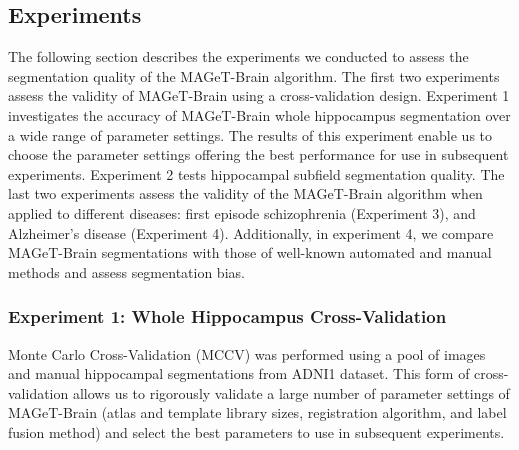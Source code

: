 \documentclass{article}\usepackage{graphicx, color}
\newcommand{\mb}{MAGeT-Brain }
\begin{document}
\subsection{Experiments}

The following section describes the experiments we conducted to assess the
segmentation quality of the \mb algorithm. The first two experiments assess the
validity of \mb using a cross-validation design. Experiment 1 investigates the
accuracy of \mb whole hippocampus segmentation over a wide range of parameter
settings. The results of this experiment enable us to choose the parameter
settings offering the best performance for use in subsequent experiments.
Experiment 2 tests hippocampal subfield segmentation quality. The last two
experiments assess the validity of the \mb algorithm when applied to different
diseases: first episode schizophrenia (Experiment 3), and Alzheimer's disease
(Experiment 4). Additionally, in experiment 4, we compare \mb segmentations with
those of well-known automated and manual methods and assess segmentation bias. 

\subsubsection{Experiment 1: Whole Hippocampus Cross-Validation}

Monte Carlo Cross-Validation (MCCV) \citep{Shao1993} was performed using a pool
of images and manual hippocampal segmentations from ADNI1 dataset.  This form of
cross-validation allows us to rigorously validate a large number of parameter
settings of \mb (atlas and template library sizes, registration algorithm, and 
label fusion method) and select the best parameters to use in subsequent 
experiments.
\end{document}
